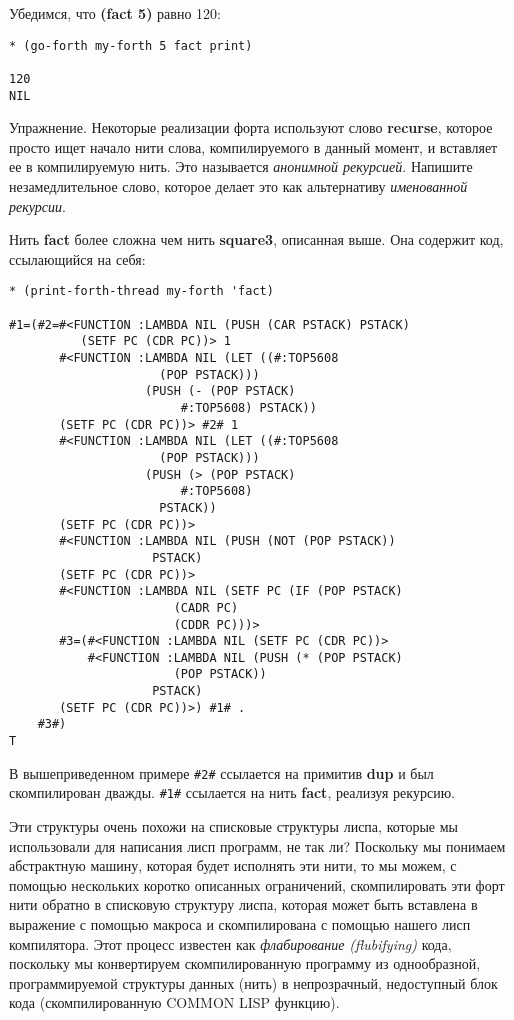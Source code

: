 Убедимся, что \textbf{(fact 5)} равно 120:

\begin{verbatim}
* (go-forth my-forth 5 fact print)

120 
NIL
\end{verbatim}

Упражнение. Некоторые реализации форта используют слово \textbf{recurse}, которое просто ищет начало нити слова, компилируемого в данный момент, и вставляет ее в компилируемую нить. Это называется \emph{анонимной рекурсией}. Напишите незамедлительное слово, которое делает это как альтернативу \emph{именованной рекурсии}.

Нить \textbf{fact} более сложна чем нить \textbf{square3}, описанная выше. Она содержит код, ссылающийся на себя:

\begin{verbatim}
* (print-forth-thread my-forth 'fact)

#1=(#2=#<FUNCTION :LAMBDA NIL (PUSH (CAR PSTACK) PSTACK)
		  (SETF PC (CDR PC))> 1
       #<FUNCTION :LAMBDA NIL (LET ((#:TOP5608
				     (POP PSTACK)))
				   (PUSH (- (POP PSTACK)
					    #:TOP5608) PSTACK))
       (SETF PC (CDR PC))> #2# 1
       #<FUNCTION :LAMBDA NIL (LET ((#:TOP5608
				     (POP PSTACK)))
				   (PUSH (> (POP PSTACK)
					    #:TOP5608)
					 PSTACK))
       (SETF PC (CDR PC))>
       #<FUNCTION :LAMBDA NIL (PUSH (NOT (POP PSTACK))
				    PSTACK)
       (SETF PC (CDR PC))>
       #<FUNCTION :LAMBDA NIL (SETF PC (IF (POP PSTACK)
					   (CADR PC)
					   (CDDR PC)))>
       #3=(#<FUNCTION :LAMBDA NIL (SETF PC (CDR PC))>
           #<FUNCTION :LAMBDA NIL (PUSH (* (POP PSTACK)
					   (POP PSTACK))
					PSTACK)
	   (SETF PC (CDR PC))>) #1# .
    #3#) 
T
\end{verbatim}

В вышеприведенном примере \verb|#2#| ссылается на примитив \textbf{dup} и был скомпилирован дважды. \verb|#1#| ссылается на нить \textbf{fact}, реализуя рекурсию.

Эти структуры очень похожи на списковые структуры лиспа, которые мы использовали для написания лисп программ, не так ли? Поскольку мы понимаем абстрактную машину, которая будет исполнять эти нити, то мы можем, с помощью нескольких коротко описанных ограничений, скомпилировать эти форт нити обратно в списковую структуру лиспа, которая может быть вставлена в выражение с помощью макроса и скомпилирована с помощью нашего лисп компилятора. Этот процесс известен как \emph{флабирование (flubifying)} кода, поскольку мы конвертируем скомпилированную программу из однообразной, программируемой структуры данных (нить) в непрозрачный, недоступный блок кода (скомпилированную COMMON LISP функцию).

